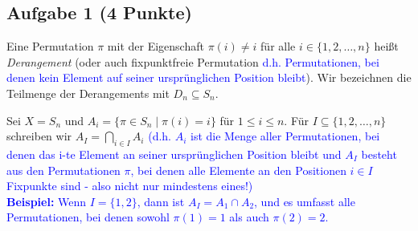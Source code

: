\documentclass{article} %
\begin{document}
\subsection*{Aufgabe 1 (4 Punkte)}
Eine Permutation $\pi$ mit der Eigenschaft $\pi(i) \neq i$ für alle $i \in \{1, 2, \dots, n\}$ heißt
\textit{Derangement} (oder auch fixpunktfreie Permutation \textcolor{Blue}{d.h. Permutationen, bei denen kein Element auf seiner ursprünglichen Position bleibt}). Wir bezeichnen die Teilmenge der
Derangements mit $D_n \subseteq S_n$.

Sei $X = S_n$ und $A_i = \{\pi \in S_n \mid \pi(i) = i\}$ für $1 \leq i \leq n$. Für $I \subseteq \{1, 2, \dots, n\}$ schreiben wir
$A_I = \bigcap_{i \in I} A_i$ \textcolor{Blue}{(d.h. $A_i$ ist die Menge aller Permutationen, bei denen das i-te Element an seiner ursprünglichen Position bleibt und $A_I$ besteht aus den Permutationen $\pi$, bei denen alle Elemente an den Positionen $i \in I$ Fixpunkte sind - also nicht nur mindestens eines!)} \\
\textcolor{Blue}{\textbf{Beispiel: }Wenn \( I = \{1, 2\} \), dann ist \( A_I = A_1 \cap A_2 \), und es umfasst alle Permutationen, bei denen sowohl \( \pi(1) = 1 \) als auch \( \pi(2) = 2 \).
}
\end{document}
